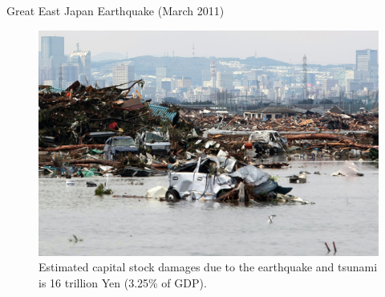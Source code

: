 \documentclass[serif, aspectratio=169]{beamer}
\begin{document}
\begin{frame}{Great East Japan Earthquake (March 2011)}

  \vspace{-0.10cm} %

    \begin{minipage}{1.00\textwidth}
    
    \raggedright %
    
    \begin{figure}[h!]

      \begin{minipage}[t]{0.48\textwidth}
        \centering
        \caption*{Estimated capital stock damages due to the earthquake and tsunami is 16 trillion Yen (3.25\% of GDP).}
        \includegraphics[width=\textwidth,height=0.8\textwidth]{Tsunami.jpg}
      \end{minipage}
      \hfill
      \begin{minipage}[t]{0.48\textwidth}
        \centering
        

\end{minipage}
\end{figure}
\end{minipage}
\end{frame}
\end{document}
